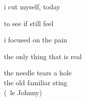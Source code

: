 
i cut myself, today\par
to see if still feel\par
i focused on the pain\par
the only thing that is real\par
\null\par
the needle tears a hole\\
the old familiar sting\\


\vspace{12pt}
(~le Johnny)
